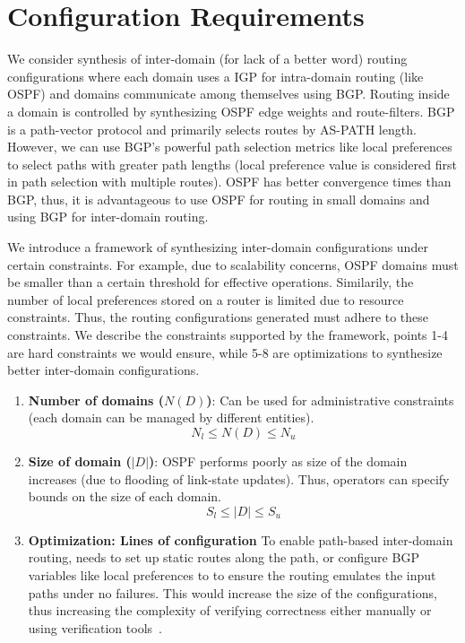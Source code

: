 \section{Configuration Requirements}
We consider synthesis of inter-domain 
(for lack of a better word) routing 
configurations where each domain uses a 
IGP for intra-domain routing (like 
OSPF) and domains communicate among 
themselves using BGP. 
Routing inside a domain is controlled 
by synthesizing OSPF edge weights and 
route-filters. BGP is a path-vector
protocol and primarily selects routes by 
AS-PATH length. However, we can 
use BGP's powerful path selection metrics 
like local preferences to select 
paths with greater path lengths (local
preference value is considered first in 
path selection with multiple routes). 
OSPF has better convergence times than BGP,
thus, it is advantageous to use OSPF for 
routing in small domains and using BGP for
inter-domain routing. 

We introduce a framework of synthesizing
inter-domain configurations under certain
constraints. For example, due to scalability
concerns, OSPF domains must be smaller than 
a certain threshold for effective operations.
Similarily, the number of local preferences 
stored on a router is limited due to 
resource constraints. Thus, the routing 
configurations generated must adhere to 
these constraints. We describe the constraints
supported by the framework, points 1-4 are 
hard constraints we would ensure, while 5-8
are optimizations to synthesize better inter-domain
configurations. 

\begin{enumerate}
	\item \textbf{Number of domains ($N(D)$)}: 
	Can be used for administrative constraints 
	(each domain can be managed by different
	entities). 
	\begin{equation}
	N_l \leq N(D) \leq N_u
	\end{equation}

	\item \textbf{Size of domain ($|D|$)}: OSPF
	performs poorly as size of the domain increases
	(due to flooding of link-state updates). Thus,
	operators can specify bounds on the size of each
	domain.
	\begin{equation}
	S_l \leq |D| \leq S_u
	\end{equation}


	\item \textbf{Optimization: Lines of configuration} 
	To enable path-based inter-domain routing, \name needs
	to set up static routes along the path, or configure BGP 
	variables like local preferences to 
	to ensure the routing emulates the input paths under no 
	failures. This would increase the size of the configurations,
	thus increasing the complexity of verifying correctness either 
	manually or using verification tools~\cite{batfish}. 

\end{enumerate}

